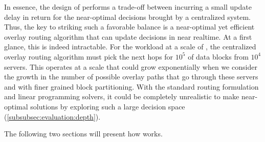 In essence, the design of \name performs a trade-off between incurring
a small update delay in return for the near-optimal
decisions brought by a centralized system. Thus, the key to striking such a
favorable balance is a near-optimal yet efficient overlay routing
algorithm that can update decisions in near realtime. At a first
glance, this is indeed intractable. For the workload at a scale of
\company, the centralized overlay routing algorithm must pick the next
hops for $10^5$ of data blocks from $10^4$ servers. This operates at a scale that
could grow exponentially when we consider the growth in the number of possible
overlay paths that go through these servers and with finer grained
block partitioning. With the standard routing formulation and linear
programming solvers, it could be completely unrealistic to make
near-optimal solutions by exploring such a large decision space
(\Section\ref{subsubsec:evaluation:depth}).


The following two sections will present how \name works.

